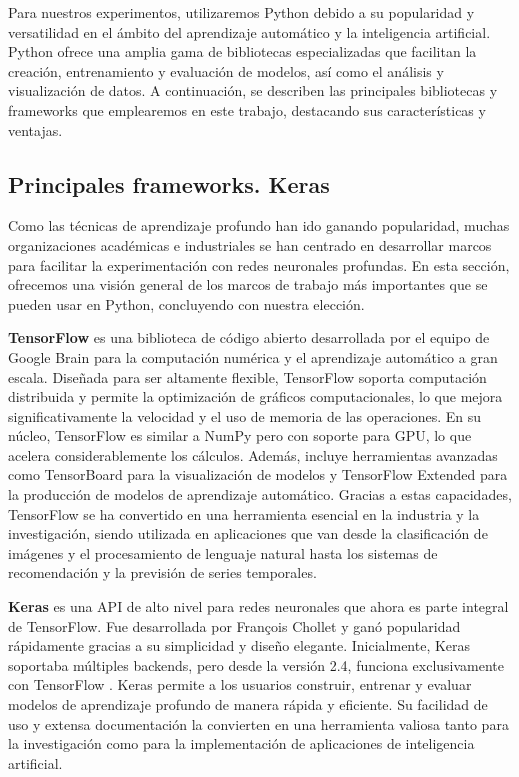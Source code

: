 Para nuestros experimentos, utilizaremos Python debido a su popularidad y versatilidad en el ámbito del aprendizaje automático y la inteligencia artificial. Python ofrece una amplia gama de bibliotecas especializadas que facilitan la creación, entrenamiento y evaluación de modelos, así como el análisis y visualización de datos. A continuación, se describen las principales bibliotecas y frameworks que emplearemos en este trabajo, destacando sus características y ventajas.


\subsection{Principales frameworks. Keras}

Como las técnicas de aprendizaje profundo han ido ganando popularidad, muchas organizaciones académicas e industriales se han centrado en desarrollar marcos para facilitar la experimentación con redes neuronales profundas. En esta sección, ofrecemos una visión general de los marcos de trabajo más importantes que se pueden usar en Python, concluyendo con nuestra elección.


\textbf{TensorFlow} \citep{tensorflow} es una biblioteca de código abierto desarrollada por el equipo de Google Brain para la computación numérica y el aprendizaje automático a gran escala. Diseñada para ser altamente flexible, TensorFlow soporta computación distribuida y permite la optimización de gráficos computacionales, lo que mejora significativamente la velocidad y el uso de memoria de las operaciones. En su núcleo, TensorFlow es similar a NumPy pero con soporte para GPU, lo que acelera considerablemente los cálculos. Además, incluye herramientas avanzadas como TensorBoard para la visualización de modelos y TensorFlow Extended para la producción de modelos de aprendizaje automático. Gracias a estas capacidades, TensorFlow se ha convertido en una herramienta esencial en la industria y la investigación, siendo utilizada en aplicaciones que van desde la clasificación de imágenes y el procesamiento de lenguaje natural hasta los sistemas de recomendación y la previsión de series temporales.


\textbf{Keras} \citep{keras} es una API de alto nivel para redes neuronales que ahora es parte integral de TensorFlow. Fue desarrollada por François Chollet y ganó popularidad rápidamente gracias a su simplicidad y diseño elegante. Inicialmente, Keras soportaba múltiples backends, pero desde la versión 2.4, funciona exclusivamente con TensorFlow \citep{muller2016introduction}. Keras permite a los usuarios construir, entrenar y evaluar modelos de aprendizaje profundo de manera rápida y eficiente. Su facilidad de uso y extensa documentación la convierten en una herramienta valiosa tanto para la investigación como para la implementación de aplicaciones de inteligencia artificial.



